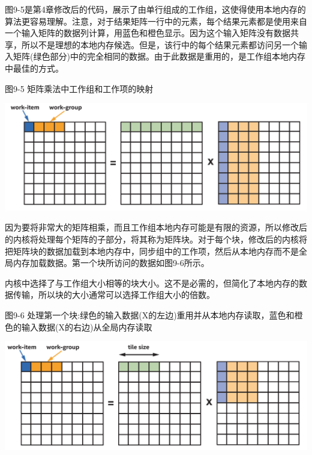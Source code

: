 图9-5是第4章修改后的代码，展示了由单行组成的工作组，这使得使用本地内存的算法更容易理解。注意，对于结果矩阵一行中的元素，每个结果元素都是使用来自一个输入矩阵的数据列计算，用蓝色和橙色显示。因为这个输入矩阵没有数据共享，所以不是理想的本地内存候选。但是，该行中的每个结果元素都访问另一个输入矩阵(绿色部分)中的完全相同的数据。由于此数据是重用的，是工作组本地内存中最佳的方式。\par

\hspace*{\fill} \par %
图9-5 矩阵乘法中工作组和工作项的映射
\begin{center}
	\includegraphics[width=1.\textwidth]{content/chapter-9/images/5}
\end{center}

因为要将非常大的矩阵相乘，而且工作组本地内存可能是有限的资源，所以修改后的内核将处理每个矩阵的子部分，将其称为矩阵块。对于每个块，修改后的内核将把矩阵块的数据加载到本地内存中，同步组中的工作项，然后从本地内存而不是全局内存加载数据。第一个块所访问的数据如图9-6所示。\par

内核中选择了与工作组大小相等的块大小。这不是必需的，但简化了本地内存的数据传输，所以块的大小通常可以选择工作组大小的倍数。\par

\hspace*{\fill} \par %
图9-6 处理第一个块:绿色的输入数据(X的左边)重用并从本地内存读取，蓝色和橙色的输入数据(X的右边)从全局内存读取
\begin{center}
	\includegraphics[width=1.\textwidth]{content/chapter-9/images/6}
\end{center}

